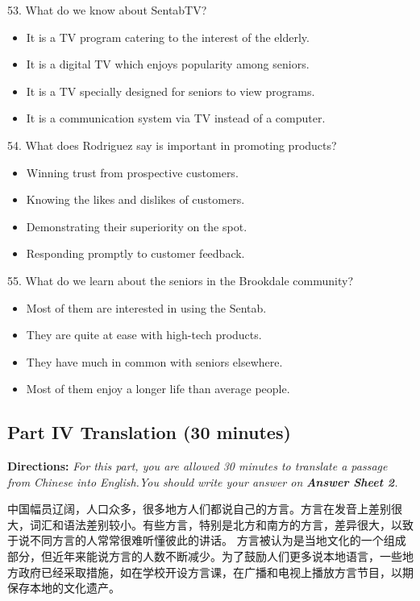 \documentclass[UTF8,11pt]{ctexart}
\begin{document}
53. What do we know about SentabTV?


\begin{itemize}[leftmargin=2em,itemsep=.2em,topsep=.4em]\item[A.] It is a TV program catering to the interest of the elderly.
\item[B.] It is a digital TV which enjoys popularity among seniors.
\item[C.] It is a TV specially designed for seniors to view programs.
\item[D.] It is a communication system via TV instead of a computer.
\end{itemize}

54. What does Rodriguez say is important in promoting products?


\begin{itemize}[leftmargin=2em,itemsep=.2em,topsep=.4em]\item[A.] Winning trust from prospective customers.
\item[B.] Knowing the likes and dislikes of customers.
\item[C.] Demonstrating their superiority on the spot.
\item[D.] Responding promptly to customer feedback.
\end{itemize}

55. What do we learn about the seniors in the Brookdale community?


\begin{itemize}[leftmargin=2em,itemsep=.2em,topsep=.4em]\item[A.] Most of them are interested in using the Sentab.
\item[B.] They are quite at ease with high-tech products.
\item[C.] They have much in common with seniors elsewhere.
\item[D.] Most of them enjoy a longer life than average people.
\end{itemize}

\subsection*{\textbf{Part} IV \textbf{Translation} \textbf{(30 minutes)}}


\textbf{Directions:}\textit{ For this part, you are allowed 30 minutes to translate a passage from Chinese into English.You should} \textit{write your answer on}\textbf{\textit{ Answer Sheet 2}}\textit{.}


中国幅员辽阔，人口众多，很多地方人们都说自己的方言。方言在发音上差别很大，词汇和语法差别较小。有些方言，特别是北方和南方的方言，差异很大，以致于说不同方言的人常常很难听懂彼此的讲话。 方言被认为是当地文化的一个组成部分，但近年来能说方言的人数不断减少。为了鼓励人们更多说本地语言，一些地方政府已经采取措施，如在学校开设方言课，在广播和电视上播放方言节目，以期保存本地的文化遗产。
\end{document}
